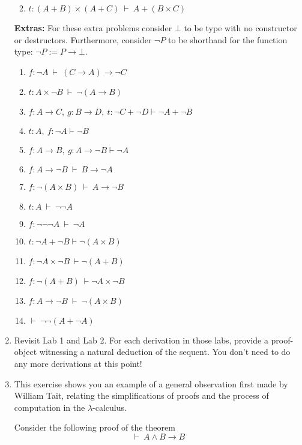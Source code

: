 \documentclass[11pt]{report}
\begin{document}
\begin{enumerate}
\begin{enumerate}
		\newpage
		\item $t : (A + B) \times (A + C) \ \vdash \ A + (B \times C)$
	\end{enumerate}
	
		\newpage
		{\bf Extras:} For these extra problems consider $\bot$ to be type with no constructor or destructors. Furthermore, consider $\lnot P$ to be shorthand for the function type: $\lnot P:= P \to \bot$.

		\begin{enumerate}
			\item $f : \lnot A \ \vdash \ (C \to A) \to \lnot C$
			\item $t : A \times \lnot B \ \vdash \ \lnot (A \to B)$
			\item $f : A \to  C, \  g : B \to  D, \ t : \neg C + \neg  D \vdash  \neg A+ \neg  B$
			\item $ t : A, \ f : \neg  A\vdash  \neg  B$
			\item $ f : A\rightarrow B, \  g : A\rightarrow \lnot B \vdash \lnot  A$
			\item $f : A \to \lnot B \ \vdash \ B \to \lnot A$
			\item $f : \lnot (A \times B) \ \vdash \ A \to \lnot B$
			\item $t : A \ \vdash \ \lnot\lnot A$
			\item $f : \lnot \lnot \lnot A \ \vdash \ \lnot A$
			\item $t : \lnot A + \lnot B \vdash \lnot( A\times  B)$
			\item $f : \lnot  A\times \lnot  B \ \vdash \lnot( A +  B)$
			\item $f : \lnot( A +  B) \ \vdash \lnot  A\times \lnot  B$
			\item $f : A \to \lnot B \ \vdash \ \lnot (A \times B)$
			\item $\vdash \ \lnot\lnot (A + \lnot A)$
		\end{enumerate}

	\item Revisit Lab 1 and Lab 2. For each derivation in those labs, provide a proof-object witnessing a natural deduction of the sequent. You don't need to do any more derivations at this point!

	\newpage
	\item This exercise shows you an example of a general observation first made by William Tait, relating the simplifications of proofs and the process of computation in the $\lambda$-calculus. 
	
	Consider the following proof of the theorem $$\vdash \ A \land B \to B$$
	

\end{enumerate}
\end{document}
